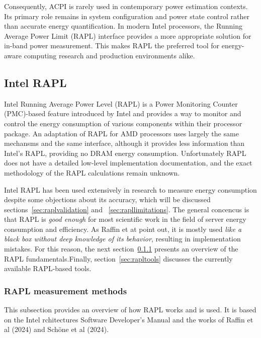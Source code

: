 Consequently, ACPI is rarely used in contemporary power estimation contexts. Its primary role remains in system configuration and power state control rather than accurate energy quantification. In modern Intel processors, the Running Average Power Limit (RAPL) interface provides a more appropriate solution for in-band power measurement. This makes RAPL the preferred tool for energy-aware computing research and production environments alike.

\subsection{Intel RAPL}
\label{sec:RAPL}
Intel Running Average Power Level (RAPL) is a Power Monitoring Counter (PMC)-based feature introduced by Intel and provides a way to monitor and control the energy consumption of various components within their processor package\parencite{projectexigence_rapl}. An adaptation of RAPL for AMD processors uses largely the same mechansms and the same interface\parencite{amd_energy}, although it provides less information than Intel's RAPL, providing no DRAM energy consumption\parencite{schone2021energy}. Unfortunately RAPL does not have a detailed low-level implementation documentation, and the exact methodology of the RAPL calculations remain unknown\parencite{jay2023experimental}.

Intel RAPL has been used extensively in research to measure energy consumption\parencite{kennes2023measuring} despite some objections about its accuracy, which will be discussed sections~\ref{sec:raplvalidation} and ~\ref{sec:rapllimitations}. The general concencus is that RAPL is \textit{good enough} for most scientific work in the field of server energy consumption and efficiency. As Raffin et at\parencite{raffin2024dissecting} point out, it is mostly used \textit{like a black box without deep knowledge of its behavior}, resulting in implementation mistakes. For this reason, the next section~\ref{sec:raplmethodology} presents an overview of the RAPL fundamentals.Finally, section~\ref{sec:rapltools} discusses the currently available RAPL-based tools.

\subsubsection{RAPL measurement methods}
\label{sec:raplmethodology}
This subsection provides an overview of how RAPL works and is used. It is based on the Intel rchitectures Software Developer’s Manual\parencite[Section 16.10]{intel-sdm} and the works of Raffin et al \parencite{raffin2024dissecting} (2024) and Schöne et al \parencite{schone2024energy} (2024).

